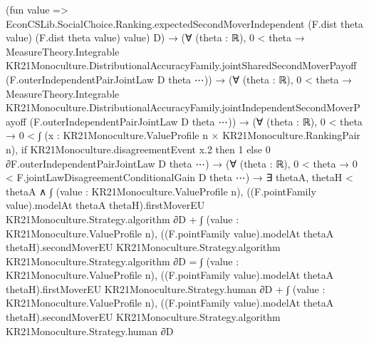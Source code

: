 \documentclass[10pt]{article}
\begin{document}
\begin{ReviewVerbatim}
                                  (fun value =>
                                    EconCSLib.SocialChoice.Ranking.expectedSecondMoverIndependent (F.dist theta value)
                                      (F.dist theta value) value)
                                  D) →
                            (∀ (theta : ℝ),
                                0 < theta →
                                  MeasureTheory.Integrable
                                    KR21Monoculture.DistributionalAccuracyFamily.jointSharedSecondMoverPayoff
                                    (F.outerIndependentPairJointLaw D theta ⋯)) →
                              (∀ (theta : ℝ),
                                  0 < theta →
                                    MeasureTheory.Integrable
                                      KR21Monoculture.DistributionalAccuracyFamily.jointIndependentSecondMoverPayoff
                                      (F.outerIndependentPairJointLaw D theta ⋯)) →
                                (∀ (theta : ℝ),
                                    0 < theta →
                                      0 <
                                        ∫ (x : KR21Monoculture.ValueProfile n × KR21Monoculture.RankingPair n),
                                          if KR21Monoculture.disagreementEvent x.2 then 1
                                          else 0 ∂F.outerIndependentPairJointLaw D theta ⋯) →
                                  (∀ (theta : ℝ), 0 < theta → 0 < F.jointLawDisagreementConditionalGain D theta ⋯) →
                                    ∃ thetaA,
                                      thetaH < thetaA ∧
                                        ∫ (value : KR21Monoculture.ValueProfile n),
                                              ((F.pointFamily value).modelAt thetaA thetaH).firstMoverEU
                                                KR21Monoculture.Strategy.algorithm ∂D +
                                            ∫ (value : KR21Monoculture.ValueProfile n),
                                              ((F.pointFamily value).modelAt thetaA thetaH).secondMoverEU
                                                KR21Monoculture.Strategy.algorithm
                                                KR21Monoculture.Strategy.algorithm ∂D =
                                          ∫ (value : KR21Monoculture.ValueProfile n),
                                              ((F.pointFamily value).modelAt thetaA thetaH).firstMoverEU
                                                KR21Monoculture.Strategy.human ∂D +
                                            ∫ (value : KR21Monoculture.ValueProfile n),
                                              ((F.pointFamily value).modelAt thetaA thetaH).secondMoverEU
                                                KR21Monoculture.Strategy.algorithm KR21Monoculture.Strategy.human ∂D
\end{ReviewVerbatim}
\end{document}
